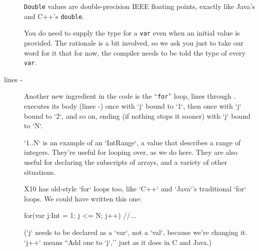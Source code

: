 \begin{description}
{\tt Double} values are double-precision IEEE floating points, exactly like Java's and C++'s
{\tt double}.  

You do need to supply
the type for a {\tt var} even when an initial value is provided.
The rationale is a bit involved, so we ask you just to take our word for it that  
for now, the compiler needs to be told the type of every {\tt var}. 

\item[lines  \xlref{mpi1-for}{7}- \xlref{mpi1-endfor}{11}]
Another new ingredient in the code is the ``{\tt for}''  loop, lines
 through .  
 executes its body (lines
-) once with \xcd`j` bound to \xcd`1`, then
once with \xcd`j` bound to \xcd`2`, and so on, ending (if nothing stops it
sooner) with \xcd`j` bound to \xcd`N`.  

\xcd`1..N` is an example of an \xcd`IntRange`, a value that describes a range
of integers.  They're useful for looping over, as we do here.  They are also
useful for declaring the subscripts of arrays, and a variety of other
situations. 


X10 has old-style \xcd`for` loops too, like \xcd`C++` and \xcd`Java`'s
traditional \xcd`for` loops.  We could have written this one:
\begin{xtennum}[]
for(var j:Int = 1; j <= N; j++) {
   //...
}
\end{xtennum}
(\xcd`j` needs to be declared as a \xcd`var`, not a \xcd`val`, because we're
changing it.  \xcd`j++` means ``Add one to \xcd`j`,'' just as it does in C and
Java.)


\end{description}
